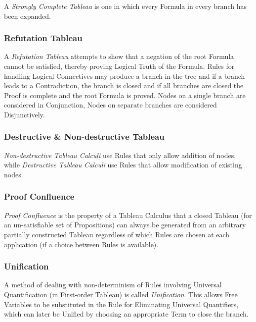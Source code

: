 A \emph{Strongly Complete Tableau} is one in which every Formula in
every branch has been expanded.



\subsubsection{Refutation Tableau}\label{sec:refutation_tableau}

A \emph{Refutation Tableau} attempts to show that a negation of the
root Formula cannot be satisfied, thereby proving Logical Truth of the
Formula. Rules for handling Logical Connectives may produce a branch
in the tree and if a branch leads to a Contradiction, the branch is
closed and if all branches are closed the Proof is complete and the
root Formula is proved. Nodes on a single branch are considered in
Conjunction, Nodes on separate branches are considered Disjunctively.



\subsubsection{Destructive \& Non-destructive Tableau}
\label{sec:destructive_tableau}

\emph{Non-destructive Tableau Calculi} use Rules that only allow
addition of nodes, while \emph{Destructive Tableau Calculi} use Rules
that allow modification of existing nodes.



\subsubsection{Proof Confluence} \label{sec:proof_confluence}

\emph{Proof Confluence} is the property of a Tableau Calculus that a
closed Tableau (for an un-satisfiable set of Propositions) can always
be generated from an arbitrary partially constructed Tableau
regardless of which Rules are chosen at each application (if a choice
between Rules is available).



\subsubsection{Unification} \label{sec:tableau_unification}

A method of dealing with non-determinism of Rules involving Universal
Quantification (in First-order Tableau) is called \emph{Unification}.
This allows Free Variables to be substituted in the Rule for
Eliminating Universal Quantifiers, which can later be Unified by
choosing an appropriate Term to close the branch.



